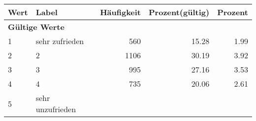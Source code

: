      \begin{longtable}{lXrrr}
     \toprule
     \textbf{Wert} & \textbf{Label} & \textbf{Häufigkeit} & \textbf{Prozent(gültig)} & \textbf{Prozent} \\
     \endhead
     \midrule
     \multicolumn{5}{l}{\textbf{Gültige Werte}}\\

     1 &
     \multicolumn{1}{X}{ sehr zufrieden   } &


       \num{560} &
       \num[round-mode=places,round-precision=2]{15.28} &
         \num[round-mode=places,round-precision=2]{1.99} \\

     2 &
     \multicolumn{1}{X}{ 2   } &


       \num{1106} &
       \num[round-mode=places,round-precision=2]{30.19} &
         \num[round-mode=places,round-precision=2]{3.92} \\

     3 &
     \multicolumn{1}{X}{ 3   } &


       \num{995} &
       \num[round-mode=places,round-precision=2]{27.16} &
         \num[round-mode=places,round-precision=2]{3.53} \\

     4 &
     \multicolumn{1}{X}{ 4   } &


       \num{735} &
       \num[round-mode=places,round-precision=2]{20.06} &
         \num[round-mode=places,round-precision=2]{2.61} \\

     5 &
     \multicolumn{1}{X}{ sehr unzufrieden   } &



\end{longtable}
